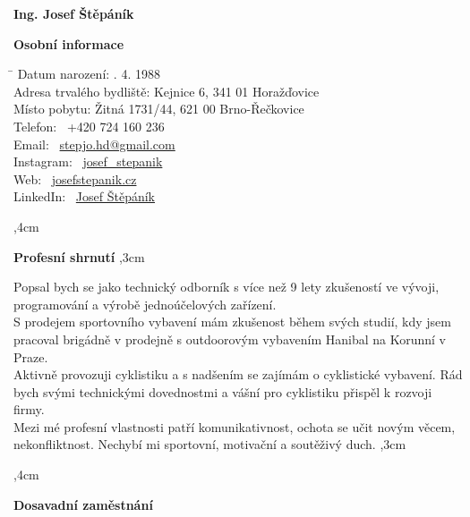 \documentclass[10pt]{article}
\begin{document}
\begin{center}
\textbf{\LARGE Ing. Josef Štěpáník} \\
\end{center}

\textbf{Osobní informace} 

\begin{tabbing}
    \hspace{6cm}\= \kill
    Datum narození: . 4. 1988 \\
    Adresa trvalého bydliště: \> Kejnice 6, 341 01 Horažďovice \\
    Místo pobytu: \> Žitná 1731/44, 621 00 Brno-Řečkovice \\
    Telefon: \> \faPhone \ +420 724 160 236 \\
    Email: \> \faEnvelope \ \href{mailto:stepjo.hd@gmail.com}{stepjo.hd@gmail.com} \\
    Instagram: \>  \faInstagram \ \href{https://www.instagram.com/josef_stepanik/}{josef\_stepanik} \\
    Web: \>  \faGlobe \ \href{https://www.josefstepanik.cz/}{josefstepanik.cz} \\
    LinkedIn: \>  \faLinkedin \ \href{https://www.linkedin.com/in/josef-štěpáník-30106174/}{Josef Štěpáník}
\end{tabbing}

\noindent\hrulefill
{},4cm

\textbf{Profesní shrnutí}
,3cm

\indent Popsal bych se jako technický odborník s více než 9 lety zkušeností ve vývoji, programování a výrobě jednoúčelových zařízení. \\
\indent S prodejem sportovního vybavení mám zkušenost během svých studií, kdy jsem pracoval brigádně v prodejně s outdoorovým vybavením Hanibal na Korunní v Praze. \\
\indent Aktivně provozuji cyklistiku a s nadšením se zajímám o cyklistické vybavení. Rád bych svými technickými dovednostmi a vášní pro cyklistiku přispěl k rozvoji firmy. \\
\indent Mezi mé profesní vlastnosti patří komunikativnost, ochota se učit novým věcem, nekonfliktnost. Nechybí mi sportovní, motivační a soutěživý duch.
,3cm

\noindent\hrulefill
{},4cm

\textbf{Dosavadní zaměstnání}
\end{document}
